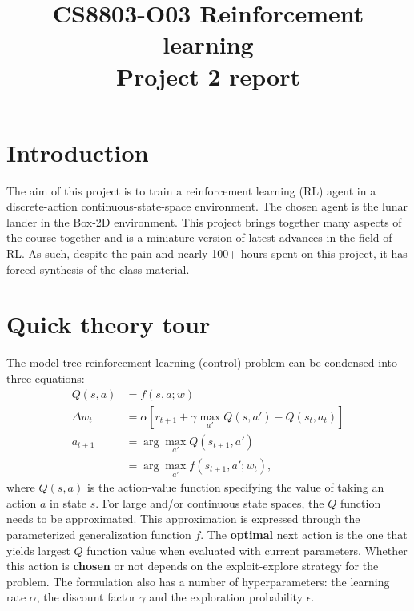 \documentclass[conference]{IEEEtran}
\begin{document}
\title{CS8803-O03 Reinforcement learning\\Project 2 report}

\author{
}
\maketitle


\IEEEpeerreviewmaketitle
\section{Introduction}
The aim of this project is to train a reinforcement learning (RL) agent in a discrete-action continuous-state-space environment. The chosen agent is the lunar lander in the Box-2D environment. This project brings together many aspects of the course together and is a miniature version of latest advances in the field of RL. As such, despite the pain and nearly 100+ hours spent on this project, it has forced synthesis of the class material.
\section{Quick theory tour}
The model-tree reinforcement learning (control) problem can be condensed into three equations:
\begin{align}
Q(s, a) &=f(s, a; w) \label{eq:fa} \\
\Delta w_t &= \alpha\left[r_{t+1} + \gamma \max_{a'}Q(s, a') - Q(s_t, a_t)\right] \label{eq:update} \\
a_{t+1} &= \arg\max_{a'} Q(s_{t+1}, a') \nonumber \\
& = \arg\max_{a'} f(s_{t+1}, a'; w_t)\label{eq:action},
\end{align}
where $Q(s, a)$ is the action-value function specifying the value of taking an action $a$ in state $s$. For large and/or continuous state spaces, the $Q$ function needs to be approximated. This approximation is expressed through the parameterized generalization function $f$. The {\bf optimal} next action is the one that yields largest $Q$ function value when evaluated with current parameters. Whether this action is {\bf chosen} or not depends on the exploit-explore strategy for the problem. The formulation also has a number of hyperparameters: the learning rate $\alpha$, the discount factor $\gamma$ and the exploration probability $\epsilon$. 
\end{document}

